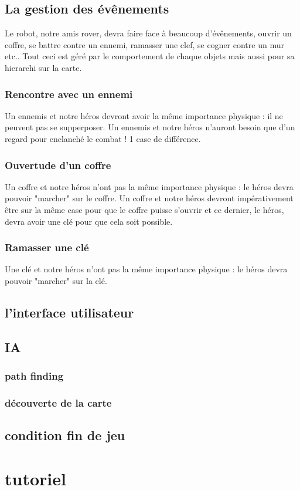 \documentclass[a4paper 12pts]{article}
\begin{document}
\subsection{La gestion des évênements}

Le robot, notre amis rover, devra faire face à beaucoup d'évênements, ouvrir un coffre, se battre contre un ennemi, ramasser une clef, se cogner contre un mur etc..
Tout ceci est géré par le comportement de chaque objets mais aussi pour sa hierarchi sur la carte.

\subsubsection {Rencontre avec un ennemi} 
Un ennemis et notre héros devront avoir la même importance physique : il ne peuvent pas se supperposer.
Un ennemis et notre héros n'auront besoin que d'un regard pour enclanché le combat ! 1 case de différence.


\subsubsection {Ouvertude d'un coffre}
Un coffre et notre héros n'ont pas la même importance physique : le héros devra pouvoir "marcher" sur le coffre.
Un coffre et notre héros devront impérativement être sur la même case pour que le coffre puisse s'ouvrir et ce dernier, 
le héros, devra avoir une clé pour que cela soit possible.


\subsubsection {Ramasser une clé}
Une clé et notre héros n'ont pas la même importance physique : le héros devra pouvoir "marcher" sur la clé.

 
\subsection{l'interface utilisateur}

\subsection{IA}

\subsubsection{path finding}

\subsubsection{découverte de la carte}

\subsection{condition fin de jeu}





\section{tutoriel}
\end{document}
